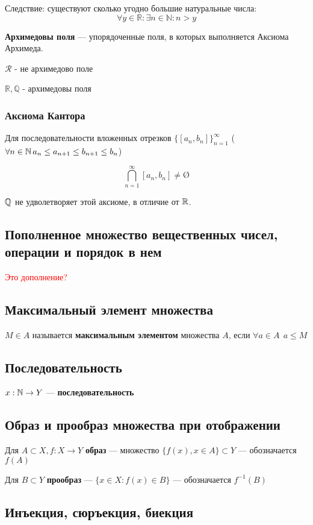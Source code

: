 Следствие: существуют сколько угодно большие натуральные числа: $$\forall y\in \mathbb{R}: \exists n\in\mathbb{N}: n>y$$

\textbf{Архимедовы поля} --- упорядоченные поля, в которых выполняется Аксиома Архимеда.

$\mathcal{R}$ - не архимедово поле

$\mathbb{R}, \mathbb{Q}$ - архимедовы поля

\subsubsection{Аксиома Кантора}

Для последовательности вложенных отрезков $\{[a_n,b_n]\}_{n=1}^\infty$ ($\forall n\in\operatorname*{\mathbb{N}} a_n\leq a_{n+1}\leq b_{n+1}\leq b_n$)

$$\bigcap\limits_{n=1}^\infty[a_n, b_n] \not = \text{\O}$$

$\operatorname*{\mathbb{Q}}$ не удволетворяет этой аксиоме, в отличие от $\operatorname*{\mathbb{R}}$.

\subsection{Пополненное множество вещественных чисел, операции и порядок в нем}
\textcolor{red}{Это дополнение?}

\subsection{Максимальный элемент множества}
$M\in A$ называется \textbf{максимальным элементом} множества $A$, если $\forall a\in A \ \ a\leq M$

\subsection{Последовательность}

$x:\operatorname*{\mathbb{N}} \rightarrow Y$ --- \textbf{последовательность}

\subsection{Образ и прообраз множества при отображении}

Для $A\subset X, f:X\to Y$ \textbf{образ} --- множество $\{f(x), x\in A\} \subset Y$ --- обозначается $f(A)$


Для $B\subset Y$ \textbf{прообраз} --- $\{ x\in X : f(x)\in B \}$ --- обозначается $f^{-1}(B)$

\subsection{Инъекция, сюръекция, биекция}

